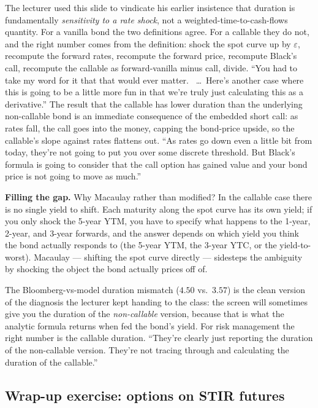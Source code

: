 The lecturer used this slide to vindicate his earlier insistence that
duration is fundamentally \emph{sensitivity to a rate shock}, not a
weighted-time-to-cash-flows quantity. For a vanilla bond the two
definitions agree. For a callable they do not, and the right number
comes from the definition: shock the spot curve up by $\varepsilon$,
recompute the forward rates, recompute the forward price, recompute
Black's call, recompute the callable as forward-vanilla minus call,
divide. ``You had to take my word for it that that would ever matter.
\ \ldots\ Here's another case where this is going to be a little more
fun in that we're truly just calculating this as a derivative.''
The result that the callable has lower duration than the underlying
non-callable bond is an immediate consequence of the embedded short
call: as rates fall, the call goes into the money, capping the
bond-price upside, so the callable's slope against rates flattens
out. ``As rates go down even a little bit from today, they're not
going to put you over some discrete threshold. But Black's formula is
going to consider that the call option has gained value and your bond
price is not going to move as much.''

\begin{tipblock}
\textbf{Filling the gap.} Why Macaulay rather than modified? In the
callable case there is no single yield to shift. Each maturity along
the spot curve has its own yield; if you only shock the 5-year YTM,
you have to specify what happens to the 1-year, 2-year, and 3-year
forwards, and the answer depends on which yield you think the bond
actually responds to (the 5-year YTM, the 3-year YTC, or the
yield-to-worst). Macaulay --- shifting the spot curve directly ---
sidesteps the ambiguity by shocking the object the bond actually
prices off of.
\end{tipblock}

The Bloomberg-vs-model duration mismatch ($4.50$ vs.\ $3.57$) is the
clean version of the diagnosis the lecturer kept handing to the class:
the screen will sometimes give you the duration of the
\emph{non-callable} version, because that is what the analytic formula
returns when fed the bond's yield. For risk management the right
number is the callable duration. ``They're clearly just reporting the
duration of the non-callable version. They're not tracing through and
calculating the duration of the callable.''

\subsection{Wrap-up exercise: options on STIR futures}\label{L6-sec:freddie-stir}

